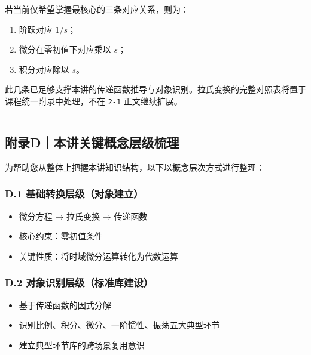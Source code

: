 \documentclass[
  11pt]{article}
\providecommand{\tightlist}{%
  \setlength{\itemsep}{0pt}\setlength{\parskip}{0pt}}
\begin{document}
若当前仅希望掌握最核心的三条对应关系，则为：

\begin{enumerate}
\def\labelenumi{\arabic{enumi}.}
\tightlist
\item
  阶跃对应 \(1/s\)；
\item
  微分在零初值下对应乘以 \(s\)；
\item
  积分对应除以 \(s\)。
\end{enumerate}

此几条已足够支撑本讲的传递函数推导与对象识别。拉氏变换的完整对照表将置于课程统一附录中处理，不在
\texttt{2-1} 正文继续扩展。

\begin{center}\rule{0.5\linewidth}{0.5pt}\end{center}

\subsection{附录D｜本讲关键概念层级梳理}\label{ux9644ux5f55dux672cux8bb2ux5173ux952eux6982ux5ff5ux5c42ux7ea7ux68b3ux7406}

为帮助您从整体上把握本讲知识结构，以下以概念层次方式进行整理：

\subsubsection{D.1
基础转换层级（对象建立）}\label{d.1-ux57faux7840ux8f6cux6362ux5c42ux7ea7ux5bf9ux8c61ux5efaux7acb}

\begin{itemize}
\tightlist
\item
  微分方程 → 拉氏变换 → 传递函数
\item
  核心约束：零初值条件
\item
  关键性质：将时域微分运算转化为代数运算
\end{itemize}

\subsubsection{D.2
对象识别层级（标准库建设）}\label{d.2-ux5bf9ux8c61ux8bc6ux522bux5c42ux7ea7ux6807ux51c6ux5e93ux5efaux8bbe}

\begin{itemize}
\tightlist
\item
  基于传递函数的因式分解
\item
  识别比例、积分、微分、一阶惯性、振荡五大典型环节
\item
  建立典型环节库的跨场景复用意识
\end{itemize}
\end{document}
